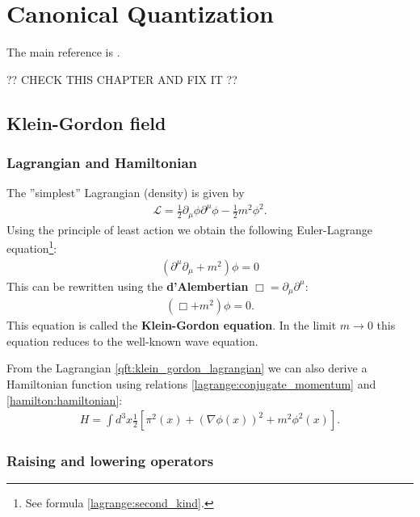 \chapter{Canonical Quantization}

    The main reference is \cite{Peskin}.

    ?? CHECK THIS CHAPTER AND FIX IT ??

\section{Klein-Gordon field}
\subsection{Lagrangian and Hamiltonian}

    The ''simplest'' Lagrangian (density) is given by
    \begin{gather}
        \label{qft:klein_gordon_lagrangian}
        \mathcal{L} = \frac{1}{2}\partial_\mu\phi\partial^\mu\phi - \frac{1}{2}m^2\phi^2.
    \end{gather}
    Using the principle of least action we obtain the following Euler-Lagrange equation\footnote{See formula \ref{lagrange:second_kind}.}:
    \begin{gather}
        \left(\partial^\mu\partial_\mu + m^2\right)\phi = 0
    \end{gather}
    This can be rewritten using the \textbf{d'Alembertian} $\Box = \partial_\mu\partial^\mu$:
    \begin{gather}
        \label{qft:klein_gordon_equation}
        (\Box+m^2)\phi = 0.
    \end{gather}
    This equation is called the \textbf{Klein-Gordon equation}. In the limit $m\rightarrow0$ this equation reduces to the well-known wave equation.

    From the Lagrangian \ref{qft:klein_gordon_lagrangian} we can also derive a Hamiltonian function using relations \ref{lagrange:conjugate_momentum} and \ref{hamilton:hamiltonian}:
    \begin{gather}
        \label{qft:klein_gordon_hamiltonian}
        H = \int d^3x \frac{1}{2}\left[\pi^2(x) + (\nabla\phi(x))^2 + m^2\phi^2(x)\right].
    \end{gather}

\subsection{Raising and lowering operators}

